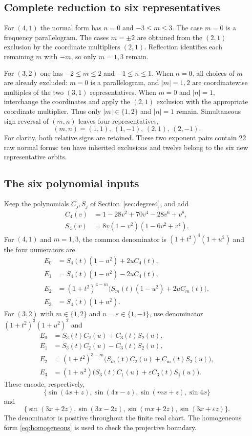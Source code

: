 \documentclass[11pt]{article}
\theoremstyle{definition}\newtheorem{definition}[theorem]{Definition}
\theoremstyle{remark}\newtheorem{remark}[theorem]{Remark}
\begin{document}
\subsection{Complete reduction to six representatives}
For $(4,1)$ the normal form has $n=0$ and $-3\le m\le3$. The case $m=0$ is a frequency parallelogram. The cases $m=\pm2$ are obtained from the $(2,1)$ exclusion by the coordinate multipliers $(2,1)$. Reflection identifies each remaining $m$ with $-m$, so only $m=1,3$ remain.

For $(3,2)$ one has $-2\le m\le2$ and $-1\le n\le1$. When $n=0$, all choices of $m$ are already excluded: $m=0$ is a parallelogram, and $|m|=1,2$ are coordinatewise multiples of the two $(3,1)$ representatives. When $m=0$ and $|n|=1$, interchange the coordinates and apply the $(2,1)$ exclusion with the appropriate coordinate multiplier. Thus only $|m|\in\{1,2\}$ and $|n|=1$ remain. Simultaneous sign reversal of $(m,n)$ leaves four representatives,
\[
(m,n)=(1,1),\ (1,-1),\ (2,1),\ (2,-1).
\]
For clarity, both relative signs are retained. These two exponent pairs contain 22 raw normal forms: ten have inherited exclusions and twelve belong to the six new representative orbits.

\subsection{The six polynomial inputs}
Keep the polynomials $C_j,S_j$ of Section~\ref{sec:degree4}, and add
\begin{align*}
C_4(v)&=1-28v^2+70v^4-28v^6+v^8,\\
S_4(v)&=8v(1-v^2)(1-6v^2+v^4).
\end{align*}
For $(4,1)$ and $m=1,3$, the common denominator is $(1+t^2)^4(1+u^2)$ and the four numerators are
\begin{align*}
E_0&=S_4(t)(1-u^2)+2uC_4(t),\\
E_1&=S_4(t)(1-u^2)-2uC_4(t),\\
E_2&=(1+t^2)^{4-m}\bigl(S_m(t)(1-u^2)+2uC_m(t)\bigr),\\
E_3&=S_4(t)(1+u^2).
\end{align*}
For $(3,2)$ with $m\in\{1,2\}$ and $n=\varepsilon\in\{1,-1\}$, use denominator $(1+t^2)^3(1+u^2)^2$ and
\begin{align*}
E_0&=S_3(t)C_2(u)+C_3(t)S_2(u),\\
E_1&=S_3(t)C_2(u)-C_3(t)S_2(u),\\
E_2&=(1+t^2)^{3-m}\bigl(S_m(t)C_2(u)+C_m(t)S_2(u)\bigr),\\
E_3&=(1+u^2)\bigl(S_3(t)C_1(u)+\varepsilon C_3(t)S_1(u)\bigr).
\end{align*}
These encode, respectively,
\[
\{\sin(4x+z),\sin(4x-z),\sin(mx+z),\sin4x\}
\]
and
\[
\{\sin(3x+2z),\sin(3x-2z),\sin(mx+2z),\sin(3x+\varepsilon z)\}.
\]
The denominator is positive throughout the finite real chart. The homogeneous form \eqref{eq:homogeneous} is used to check the projective boundary.
\end{document}
